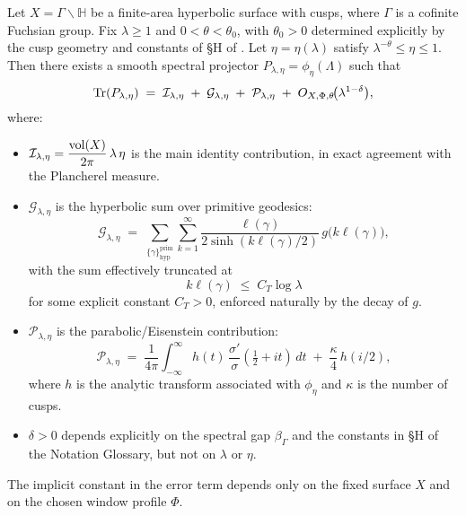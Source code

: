 \medskip

\begin{theorem}\label{thm:intro-localized-trace}
Let $X=\Gamma\backslash\mathbb{H}$ be a finite-area hyperbolic surface with cusps,
where $\Gamma$ is a cofinite Fuchsian group.
Fix $\lambda\ge 1$ and $0<\theta<\theta_0$, with $\theta_0>0$ determined explicitly
by the cusp geometry and constants of \S H of .
Let $\eta=\eta(\lambda)$ satisfy $\lambda^{-\theta}\le \eta\le 1$.
Then there exists a smooth spectral projector $P_{\lambda,\eta}=\phi_\eta(\Lambda)$
such that
\[
  \operatorname{Tr}(P_{\lambda,\eta})
  \;=\;
  \mathcal{I}_{\lambda,\eta}
  \;+\;
  \mathcal{G}_{\lambda,\eta}
  \;+\;
  \mathcal{P}_{\lambda,\eta}
  \;+\;
  O_{X,\Phi,\theta}\!\big(\lambda^{1-\delta}\big),
\]
where:
\begin{itemize}
  \item $\mathcal{I}_{\lambda,\eta} = \dfrac{\operatorname{vol}(X)}{2\pi}\,\lambda\,\eta$
        is the main identity contribution, in exact agreement with the Plancherel measure.
  \item $\mathcal{G}_{\lambda,\eta}$ is the hyperbolic sum over primitive geodesics:
  \[
    \mathcal{G}_{\lambda,\eta}
    \;=\;
    \sum_{\{\gamma\}^{\mathrm{prim}}_{\mathrm{hyp}}}
    \sum_{k=1}^\infty
    \frac{\ell(\gamma)}{2\sinh(k\ell(\gamma)/2)}\,
    g\!\big(k\ell(\gamma)\big),
  \]
  with the sum effectively truncated at
  \[
    k\ell(\gamma)\;\leq\; C_T\log\lambda
  \]
  for some explicit constant $C_T>0$,
  enforced naturally by the decay of $g$.
  \item $\mathcal{P}_{\lambda,\eta}$ is the parabolic/Eisenstein contribution:
  \[
    \mathcal{P}_{\lambda,\eta}
    \;=\;
    \frac{1}{4\pi}\int_{-\infty}^{\infty}
      h(t)\,\frac{\sigma'}{\sigma}(\tfrac{1}{2}+it)\,dt
    \;+\;
    \frac{\kappa}{4}\,h(i/2),
  \]
  where $h$ is the analytic transform associated with $\phi_\eta$
  and $\kappa$ is the number of cusps.
  \item $\delta>0$ depends explicitly on the spectral gap $\beta_\Gamma$
        and the constants in \S H of the Notation Glossary,
        but not on $\lambda$ or $\eta$.
\end{itemize}
The implicit constant in the error term depends only on the fixed surface $X$
and on the chosen window profile $\Phi$.
\end{theorem}

\medskip

